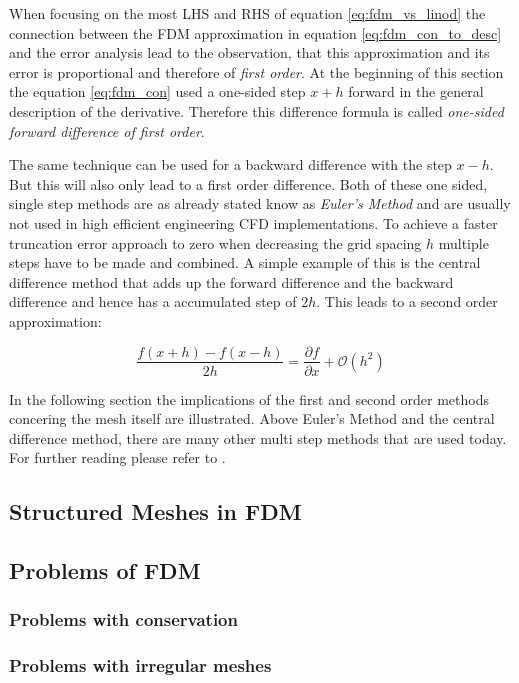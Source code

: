 When focusing on the most LHS and RHS of equation \ref{eq:fdm_vs_linod} the connection between the FDM approximation in equation \ref{eq:fdm_con_to_desc}
and the error analysis lead to the observation, that this approximation and its error is proportional and therefore of \emph{first order}. At the beginning of this section the equation \ref{eq:fdm_con} used a one-sided step $x+h$ forward in the general description of the derivative. Therefore this difference formula is called \emph{one-sided forward difference of first order}.

The same technique can be used for a backward difference with the step $x-h$. But this will also only lead to a first order difference. Both of these one sided, single step methods are as already stated know as \emph{Euler's Method} and are usually not used in high efficient engineering CFD implementations. To achieve a faster truncation error approach to zero when decreasing the grid spacing $h$ multiple steps have to be made and combined. A simple example of this is the central difference method that adds up the forward difference and the backward difference and hence has a accumulated step of $2h$. This leads to a second order
approximation:

\begin{equation}\label{eq:fdm_centraldiff}
\frac {f(x+h) - f(x-h)}{2h} = 
\frac{\partial f}{\partial x} + \mathcal{O}(h^2)
\end{equation}

In the following section the implications of the first and second order methods concering the mesh itself are illustrated. Above Euler's Method and the central difference method, there are many other multi step methods that are used today. For further reading please refer to \citep {Milne2000}.


\subsection{Structured Meshes in FDM}

\subsection{Problems of FDM}
\label{sec:problems_of_fdm}
\subsubsection{Problems with conservation}
\subsubsection{Problems with irregular meshes}



